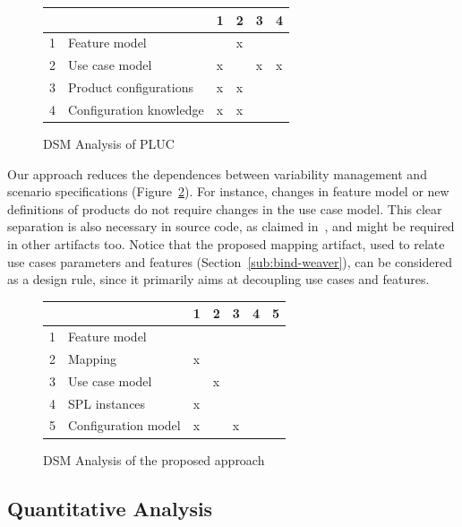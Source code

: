 \documentclass{acm_proc_article-sp}
\begin{document}
\begin{figure}[htb]
\centering
\begin{small}
\begin{tabular}{llllll} \hline
&  & 1 & 2 & 3 & 4 \\ \hline
1 & Feature model 			& 	& x	& 	&   	\\ 
2 & Use case model 		& x 	&  	&  x	&  x  \\ 
3 & Product configurations	& x 	& x	& 	&    	\\
4 & Configuration knowledge 	& x 	& x 	& 	&    	\\ \hline
\end{tabular}
\end{small}
\caption{DSM Analysis of PLUC}
\label{dsm:pluc}
\end{figure}

Our approach reduces the dependences between variability management and scenario
specifications (Figure~\ref{dsm:cc}). For instance, changes in feature model or
new definitions of products do not require changes in the use case model. This
clear separation is also necessary in source code, as claimed
in~\cite{Alves:2006aa,Apel:2006aa}, and might be required in other artifacts
too. Notice that the proposed mapping artifact, used to relate use cases
parameters and features (Section~\ref{sub:bind-weaver}), can be considered as a
design rule, since it primarily aims at decoupling use cases and features.

\begin{figure}[h]
\centering
\begin{small}
\begin{tabular}{lllllll} \hline
& & 1 & 2 & 3 & 4 & 5 \\ \hline
1 & Feature model 		& 	& 	&      &  	&  	\\ 
2 & Mapping	 		& x	&	&	&	&  	\\
3 & Use case model 	&  	&  x	&  	&  	& 	\\
4 & SPL instances 		& x 	& 	& 	&   	& 	\\
5 & Configuration model 	& x 	&  	&  x	&  	& 	\\  \hline
\end{tabular}
\end{small}
\caption{DSM Analysis of the proposed approach}
\label{dsm:cc}
\end{figure}   

\subsection{Quantitative Analysis}
\end{document}
